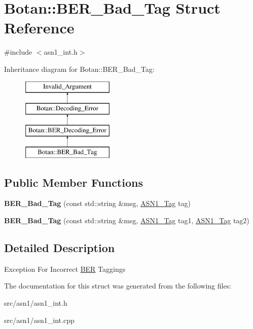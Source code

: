 \hypertarget{structBotan_1_1BER__Bad__Tag}{\section{Botan\-:\-:B\-E\-R\-\_\-\-Bad\-\_\-\-Tag Struct Reference}
\label{structBotan_1_1BER__Bad__Tag}
}


{\ttfamily \#include $<$asn1\-\_\-int.\-h$>$}

Inheritance diagram for Botan\-:\-:B\-E\-R\-\_\-\-Bad\-\_\-\-Tag\-:\begin{figure}[H]
\begin{center}
\leavevmode
\includegraphics[height=4.000000cm]{structBotan_1_1BER__Bad__Tag}
\end{center}
\end{figure}
\subsection*{Public Member Functions}
\begin{DoxyCompactItemize}
\item 
\hypertarget{structBotan_1_1BER__Bad__Tag_a1e163dfa463c4c1f03478a648fedd044}{{\bfseries B\-E\-R\-\_\-\-Bad\-\_\-\-Tag} (const std\-::string \&msg, \hyperlink{namespaceBotan_aaa08f67a945ef195fa39e62659dffa7a}{A\-S\-N1\-\_\-\-Tag} tag)}\label{structBotan_1_1BER__Bad__Tag_a1e163dfa463c4c1f03478a648fedd044}

\item 
\hypertarget{structBotan_1_1BER__Bad__Tag_acee27c5662b7726863626ba0870644c5}{{\bfseries B\-E\-R\-\_\-\-Bad\-\_\-\-Tag} (const std\-::string \&msg, \hyperlink{namespaceBotan_aaa08f67a945ef195fa39e62659dffa7a}{A\-S\-N1\-\_\-\-Tag} tag1, \hyperlink{namespaceBotan_aaa08f67a945ef195fa39e62659dffa7a}{A\-S\-N1\-\_\-\-Tag} tag2)}\label{structBotan_1_1BER__Bad__Tag_acee27c5662b7726863626ba0870644c5}

\end{DoxyCompactItemize}


\subsection{Detailed Description}
Exception For Incorrect \hyperlink{namespaceBotan_1_1BER}{B\-E\-R} Taggings 

The documentation for this struct was generated from the following files\-:\begin{DoxyCompactItemize}
\item 
src/asn1/asn1\-\_\-int.\-h\item 
src/asn1/asn1\-\_\-int.\-cpp\end{DoxyCompactItemize}
